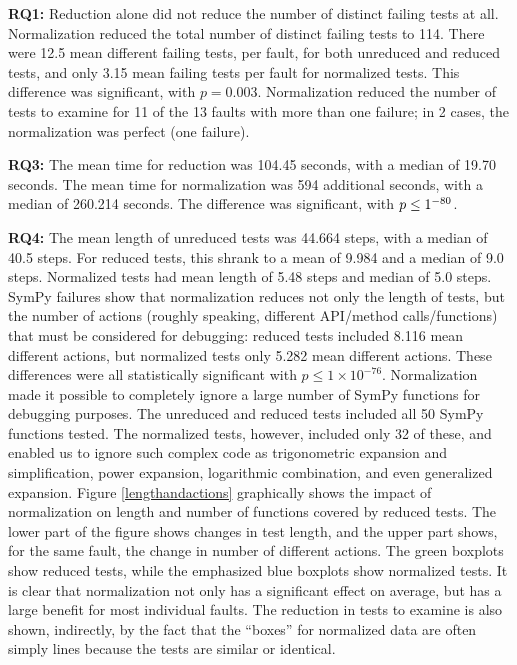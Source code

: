{\bf RQ1:} Reduction alone did not reduce the number of distinct failing tests at
all.  Normalization reduced the total number of distinct
failing tests to 114.  There were
12.5 mean different failing tests, per fault, for both unreduced and
reduced tests, and only 3.15 mean failing tests per fault for
normalized tests.  This difference was significant, with $p=0.003$.
Normalization reduced the number of tests to
examine for 11 of the 13 faults with more than one failure; in 2 cases, the normalization was perfect (one failure).

{\bf RQ3:} The mean time for reduction was 104.45 seconds, with a
median of 19.70 seconds.  The mean time for normalization was
594 additional seconds, with a median of 260.214 seconds.  The
difference was significant, with $p\leq1\time10^{-80}$.

{\bf RQ4:} The mean length of unreduced tests was 44.664 steps, with a median
of 40.5 steps.  For reduced tests, this shrank to a mean of
9.984 and a median of 9.0 steps.  Normalized tests had mean length of
5.48 steps and median of 5.0 steps.  SymPy failures show
that normalization reduces not only the length of tests, but the number of
actions (roughly speaking, different API/method calls/functions) that must be considered for debugging:  reduced tests included
8.116 mean different actions, but normalized tests only 5.282
mean different actions.  These differences were all statistically
significant with $p\leq1\times10^{-76}$.  
Normalization made it possible to completely ignore a large number of
SymPy functions for debugging purposes.  The unreduced and reduced
tests included all 50 SymPy functions tested.  The normalized tests,
however, included only 32 of these, and enabled us to ignore such
complex code as trigonometric expansion and simplification, power expansion,
logarithmic combination, and even generalized expansion.  Figure
\ref{lengthandactions} graphically shows the impact of normalization
on length and number of functions covered by reduced tests.  The lower
part of the figure shows changes in test length, and the upper part
shows, for the same fault, the change in number of different actions.
The green boxplots show reduced tests, while the emphasized blue
boxplots show normalized tests.  It is clear that normalization not
only has a significant effect on average, but has a large benefit for
most individual faults.  The reduction in tests to examine
is also shown, indirectly, by the fact that the ``boxes'' for
normalized data are often simply lines because the tests are similar or identical.

